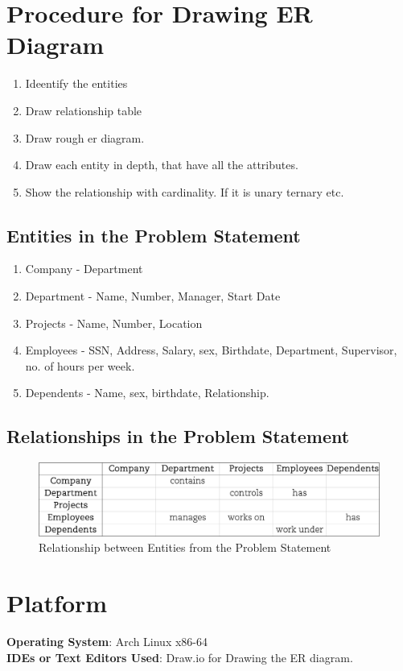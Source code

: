 \documentclass[11pt]{article}
\begin{document}
\section{Procedure for Drawing ER Diagram}
\begin{enumerate}
	\item Ideentify the entities
	\item Draw relationship table
	\item Draw rough er diagram.
	\item Draw each entity in depth, that have all the attributes.
	\item Show the relationship with cardinality. If it is unary ternary etc.
\end{enumerate}


\subsection{Entities in the Problem Statement}
\begin{enumerate}
	\item Company - Department
	\item Department - Name, Number, Manager, Start Date
	\item Projects - Name, Number, Location
	\item Employees - SSN, Address, Salary, sex, Birthdate, Department, Supervisor, no. of hours per week.
	\item Dependents - Name, sex, birthdate, Relationship.
\end{enumerate}

\subsection{Relationships in the Problem Statement}
\begin{figure}[H]
	\centering
	\includegraphics[scale=0.5]{table.png}
	\caption{Relationship between Entities from the Problem Statement}
\end{figure}


\section{Platform}
\textbf{Operating System}: Arch Linux x86-64 \\
\textbf{IDEs or Text Editors Used}: Draw.io for Drawing the ER diagram. \\
\end{document}
